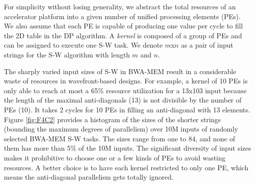 For simplicity without losing generality, 
we abstract the total resources of an accelerator platform into a given number of unified processing elements (PEs). 
We also assume that each PE is capable of producing one value per cycle to fill the 2D table in the DP algorithm. 
A \textit{kernel} is composed of a group of PEs and can be assigned to execute one S-W task.
We denote $m$x$n$ as a pair of input strings for the S-W algorithm with length $m$ and $n$. 

The sharply varied input sizes of S-W in BWA-MEM result in a considerable waste of resources in wavefront-based designs. 
For example, a kernel of 10 PEs is only able to reach at most a 65\% resource utilization for a 13x103 input because the length of the maximal anti-diagonals (13) is not divisible by the number of PEs (10). It takes 2 cycles for 10 PEs in filling an anti-diagonal with 13 elements.
Figure \ref{fig:F4C2} provides a histogram of the sizes of the shorter strings (bounding the maximum degrees of parallelism) over 10M inputs of randomly selected BWA-MEM S-W tasks. 
The sizes range from one to 84, and none of them has more than 5\% of the 10M inputs. 
The significant diversity of input sizes makes it prohibitive to choose one or a few kinds of PEs to avoid wasting resources.
A better choice is to have each kernel restricted to only one PE, which means the anti-diagonal parallelism gets totally ignored.

